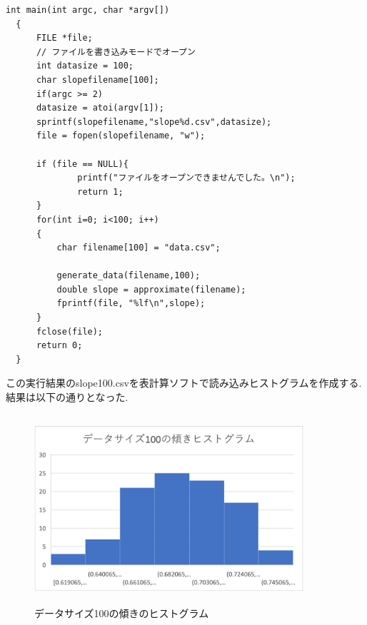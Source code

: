 \documentclass[a4j,10pt,dvipdfmx]{jarticle}
\begin{document}
\begin{lstlisting}[label=main, caption=main.c]
  int main(int argc, char *argv[])
  {
      FILE *file;
      // ファイルを書き込みモードでオープン
      int datasize = 100;
      char slopefilename[100];
      if(argc >= 2)
      datasize = atoi(argv[1]);
      sprintf(slopefilename,"slope%d.csv",datasize);
      file = fopen(slopefilename, "w");
      
      if (file == NULL){
              printf("ファイルをオープンできませんでした。\n");
              return 1;
      }
      for(int i=0; i<100; i++)
      {
          char filename[100] = "data.csv";
         
          generate_data(filename,100);
          double slope = approximate(filename);
          fprintf(file, "%lf\n",slope);
      }
      fclose(file);
      return 0;
  }  
\end{lstlisting}
この実行結果のslope100.csvを表計算ソフトで読み込みヒストグラムを作成する.
結果は以下の通りとなった.
\begin{figure}[H]
  \begin{center}
  \includegraphics[height=7cm,width=10cm]{2-2-100.png}
  \caption{データサイズ100の傾きのヒストグラム}
\end{center}
\end{figure}
\end{document}
